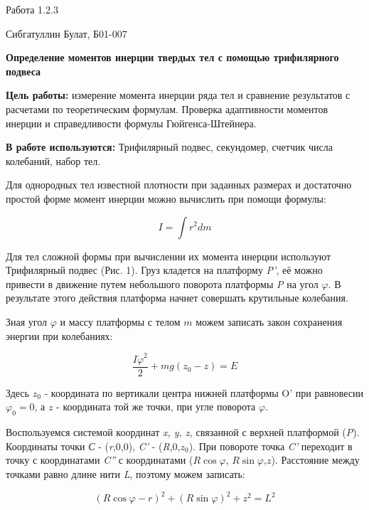 \documentclass[12pt,a4paper]{article}
\begin{document}
\begin{center}
    \large
    Работа 1.2.3
    
    Сибгатуллин Булат, Б01-007
    
    \vspace{0.5cm}
    \textbf{Определение моментов инерции твердых тел с помощью трифилярного подвеса}

\end{center}

\vspace{0.5cm}
\textbf{Цель работы:} измерение момента инерции ряда тел и сравнение результатов с расчетами по теоретическим формулам. Проверка адаптивности моментов инерции и справедливости формулы Гюйгенса-Штейнера.

\vspace{0.5cm}
\textbf{В работе используются:} Трифилярный подвес, секундомер, счетчик числа колебаний, набор тел.

Для однородных тел известной плотности при заданных размерах и достаточно простой форме момент инерции можно вычислить при помощи формулы:

\[I = \int r^2 dm\]

Для тел сложной формы при вычислении их момента инерции используют Трифилярный подвес (Рис. 1). Груз кладется на платформу \textit{P'}, её можно привести в движение путем небольшого поворота платформы \textit{P} на угол $\varphi$. В результате этого действия платформа начнет совершать крутильные колебания.

Зная угол $\varphi$ и массу платформы с телом $m$ можем записать закон сохранения энергии при колебаниях:

\begin{equation}\label{1}
\frac{I \dot{\varphi}^2}{2} + mg(z_0 - z) = E
\end{equation}

Здесь $z_0$ - координата по вертикали центра нижней платформы \textsc{O'} при равновесии $\varphi_0 = 0$, а $z$ -  координата той же точки, при угле поворота $\varphi$.

Воспользуемся системой координат \textit{x, y, z,} связанной с верхней платформой (\textit{P}). Координаты точки \textit{С} - (\textit{r},0,0), \textit{C'} - (\textit{R},0,$z_0$). При повороте точка \textit{C'} переходит в точку с координатами \textit{C''} с координатами ($R\cos \varphi$, $R\sin\varphi$,$z$). Расстояние между точками равно длине нити \textit{L}, поэтому можем записать:

\begin{equation}\label{2}
(R\cos\varphi - r)^2 + (R\sin\varphi)^2+z^2 = L^2
\end{equation}
\end{document}
